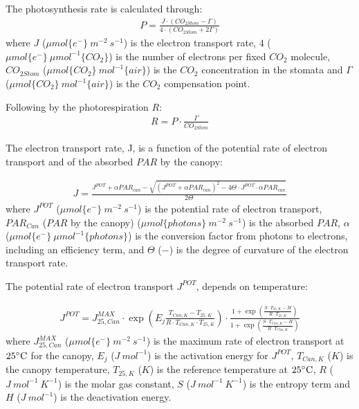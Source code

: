 \documentclass[a4paper]{article}
\numberwithin{equation}{section}
\begin{document}
The photosynthesis rate is calculated through:
\begin{align}
  P = \frac{J \cdot (CO_{2Stom} - \Gamma)}{4 \cdot (CO_{2Stom} + 2\Gamma)}
\end{align}
where \( J \) (\( \mu mol\{e^-\}\ m^{-2}\ s^{-1} \)) is the electron transport rate, \( 4 \) (\( \mu mol \{e^-\}\ \mu mol^{-1} \{CO_2\} \)) is the number of electrons per fixed \( CO_2 \) molecule, \( CO_{2Stom} \) (\( \mu mol\{CO_2\}\ mol^{-1}\{air\} \)) is the \( CO_2 \) concentration in the stomata and \( \Gamma \) (\( \mu mol \{CO_2\}\ mol^{-1} \{air\} \)) is the \( CO_2 \) compensation point.

Following by the photorespiration \( R \):
\begin{align}
  R = P \cdot \frac{\Gamma}{CO_{2Stom}}
\end{align}

The electron transport rate, J, is a function of the potential rate of electron transport and of the absorbed \( PAR \) by the canopy:

\begin{align}
  J = \frac{J^{POT} + \alpha PAR_{can} - {\sqrt{{(J^{POT} + \alpha PAR_{can})}^2 - 4\Theta\cdot J^{POT}\cdot \alpha PAR_{can}}}}{2 \Theta}
\end{align}
where \( J^{POT} \) (\( \mu mol\{e^-\}\ m^{-2}\ s^{-1} \)) is the potential rate of electron transport, \( PAR_{Can} \) (\( PAR \) by the canopy) (\( \mu mol\{photons\}\ m^{-2}\ s^{-1} \)) is the absorbed \( PAR \), \( \alpha \) (\( \mu mol\{e^-\}\ \mu mol^{-1}\{photons\} \)) is the conversion factor from photons to electrons, including an efficiency term, and \( \Theta \) (\( - \)) is the degree of curvature of the electron transport rate.

The potential rate of electron transport \( J^{POT} \), depends on temperature:

\begin{align}
  J^{POT} = J^{MAX}_{25,Can} \cdot \exp \left(E_j\frac{T_{Can,K}-T_{25,K}}{R\cdot T_{Can,K}\cdot T_{25,K}}\right) \cdot \frac{1 + \exp \left(\frac{S\cdot T_{25,K}-H}{R\cdot T_{25,K}}\right)}{1 + \exp \left(\frac{S\cdot T_{Can,K}-H}{R\cdot T_{Can,K}}\right)}
\end{align}
where \( J^{MAX}_{25,Can} \) (\( \mu mol \{e^-\}\ m^{-2}\ s^{-1} \)) is the maximum rate of electron transport at \( 25 \celsius \) for the canopy, \( E_j \) (\( J\ mol^{-1} \)) is the activation energy for \( J^{POT} \), \( T_{Can,K} \) (\( K \)) is the canopy temperature, \( T_{25,K} \) (\( K \)) is the reference temperature at \( 25 \celsius \), \( R \) (\( J\ mol^{-1}\ K^{-1} \)) is the molar gas constant, \( S \) (\( J\ mol^{-1}\ K^{-1} \)) is the entropy term and \( H \) (\( J\ mol^{-1} \)) is the deactivation energy.
\end{document}
